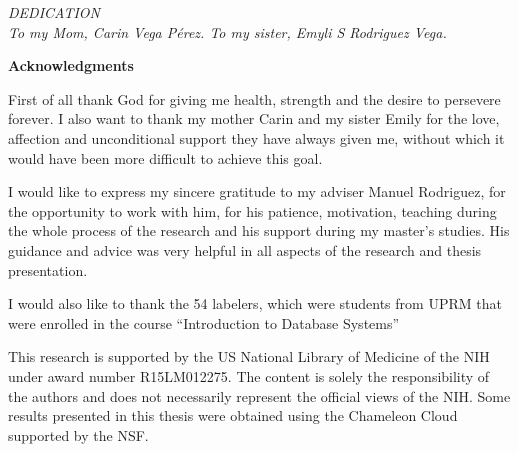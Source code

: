 \documentclass[12pt]{report}
\begin{document}
	\vspace*{\fill}
	\begin{center}
		\textit{DEDICATION}\\
		\vspace{2cm}
		\textit{To my Mom, Carin Vega P\'erez. To my sister, Emyli S Rodriguez Vega.}
	\end{center}
	\vfill
	\clearpage
	
	\vspace*{\fill}
	
	\begin{center}
		\Large \textbf{Acknowledgments}
	\end{center}
	First of all thank God for giving me health, strength and the desire to persevere forever. I also want to thank my mother Carin and my sister Emily for the love, affection and unconditional support they have always given me, without which it would have been more difficult to achieve this goal.
	
	I would like to express my sincere gratitude to my adviser Manuel Rodriguez, for the opportunity to work with him, for his patience, motivation, teaching during the whole process of the research and his support during my master's studies. His guidance and advice was very helpful in all aspects of the research and thesis presentation.
	
	I would also like to thank the 54 labelers, which were students from \ac{UPRM} that were enrolled in the course ``Introduction to Database Systems''
	
	This research is supported by the \ac{US} National Library of Medicine of the \ac{NIH} under award number R15LM012275. The content is solely the responsibility of the authors and does not necessarily represent the official views of the \ac{NIH}. Some results presented in this thesis were obtained using the Chameleon Cloud supported by the \ac{NSF}.
	\vfill
	\doublespacing
	
	\tableofcontents{}
	
	\newpage
	\printacronyms[include-classes=abbrev,name=List of Abbreviations]
	\newpage
	\listoffigures{}
	\newpage
	\listoftables{}
	
	\newpage
	
	\fancyhf{}
	\fancyhead[R]{\thepage} 
	\renewcommand{\figurename}{Fig}
	\onehalfspacing
\end{document}
